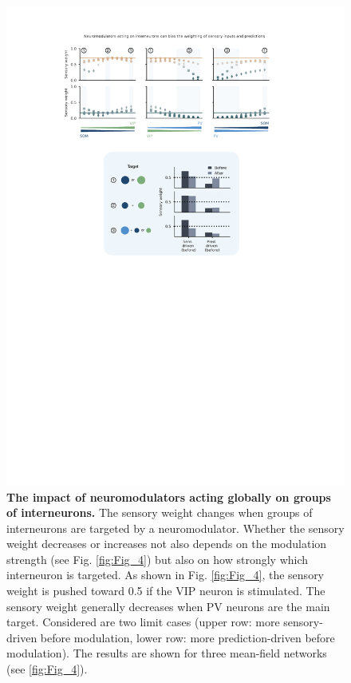 \documentclass[10pt,a4paper,draft]{article}
\begin{document}
\begin{figure}[!h]
	\centering
    \includegraphics{../results/figures/final/Fig_4_S1.pdf}%
\caption{\footnotesize{\bf The impact of neuromodulators acting globally on groups of interneurons. \newline}  
The sensory weight changes when groups of interneurons are targeted by a neuromodulator. Whether the sensory weight decreases or increases not also depends on the modulation strength (see Fig. \ref{fig:Fig_4}) but also on how strongly which interneuron is targeted.  As shown in Fig. \ref{fig:Fig_4}, the sensory weight is pushed toward 0.5 if the VIP neuron is stimulated. The sensory weight generally decreases when PV neurons are the main target. Considered are two limit cases (upper row: more sensory-driven before modulation, lower row: more prediction-driven before modulation). The results are shown for three mean-field networks (see \ref{fig:Fig_4}).
}
\label{fig:Fig_4_S1}
\end{figure}
\end{document}
